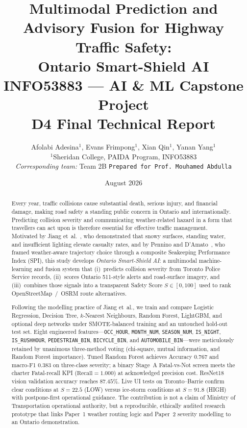 \documentclass[11pt,a4paper]{article}
\title{\textbf{Multimodal Prediction and Advisory Fusion for Highway Traffic Safety:\\
Ontario Smart-Shield AI}\\[0.6em]
\large INFO53883 --- AI \& ML Capstone Project\\
D4 Final Technical Report}
\author{
Afolabi Adesina$^{1}$, Evans Frimpong$^{1}$, Xian Qin$^{1}$, Yanan Yang$^{1}$\\[0.4em]
\normalsize $^{1}$Sheridan College, PAIDA Program, INFO53883\\
\textit{Corresponding team:} Team 2B \quad \texttt{Prepared for Prof.\ Mouhamed Abdulla}
}
\date{August 2026}
\begin{document}
\maketitle

\begin{abstract}
\noindent
Every year, traffic collisions cause substantial death, serious injury, and financial damage, making road safety a standing public concern in Ontario and internationally. Predicting collision severity and communicating weather-related hazard in a form that travellers can act upon is therefore essential for effective traffic management. Motivated by Jiang et~al.~\citep{jiang2024traffic}, who demonstrated that snowy surfaces, standing water, and insufficient lighting elevate casualty rates, and by Pennino and D'Amato~\citep{pennino2024weather}, who framed weather-aware trajectory choice through a composite Seakeeping Performance Index (SPI), this study develops \emph{Ontario Smart-Shield AI}: a multimodal machine-learning and fusion system that (i)~predicts collision severity from Toronto Police Service records, (ii)~scores Ontario 511-style alerts and road-surface imagery, and (iii)~combines those signals into a transparent Safety Score $S\in[0,100]$ used to rank OpenStreetMap~/~OSRM route alternatives.

Following the modelling practice of Jiang et~al., we train and compare Logistic Regression, Decision Tree, $k$-Nearest Neighbours, Random Forest, LightGBM, and optional deep networks under SMOTE-balanced training and an untouched hold-out test set. Eight engineered features---\texttt{OCC\_HOUR}, \texttt{MONTH\_NUM}, \texttt{SEASON\_NUM}, \texttt{IS\_NIGHT}, \texttt{IS\_RUSHHOUR}, \texttt{PEDESTRIAN\_BIN}, \texttt{BICYCLE\_BIN}, and \texttt{AUTOMOBILE\_BIN}---were meticulously retained by unanimous three-method voting (chi-square, mutual information, and Random Forest importance). Tuned Random Forest achieves Accuracy $0.767$ and macro-F1 $0.383$ on three-class severity; a binary Stage~A Fatal-vs-Not screen meets the charter Fatal-recall KPI ($\mathrm{Recall}=1.000$) at acknowledged precision cost. ResNet18 vision validation accuracy reaches $87.45\%$. Live UI tests on Toronto--Barrie confirm clear conditions at $S=22.5$ (LOW) versus ice-storm conditions at $S=91.8$ (HIGH) with postpone-first operational guidance. The contribution is not a claim of Ministry of Transportation operational authority, but a reproducible, ethically audited research prototype that links Paper~1 weather routing logic and Paper~2 severity modelling to an Ontario demonstration.
\end{abstract}
\end{document}
